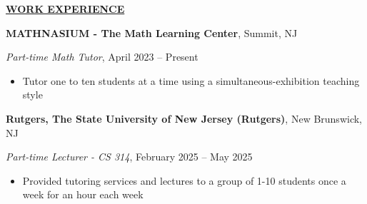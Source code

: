 \documentclass[
]{article}
\providecommand{\tightlist}{%
  \setlength{\itemsep}{0pt}\setlength{\parskip}{0pt}}
\begin{document}

\textbf{\underline{WORK EXPERIENCE}}








\textbf{MATHNASIUM - The Math Learning Center}, Summit, NJ

\emph{Part-time Math Tutor}, April 2023 -- Present

\begin{itemize}
\tightlist
\item
    Tutor one to ten students at a time using a simultaneous-exhibition teaching style
\end{itemize}

\textbf{Rutgers, The State University of New Jersey (Rutgers)}, New Brunswick, NJ

\emph{Part-time Lecturer - CS 314},  February 2025 -- May 2025

\begin{itemize}
\tightlist
\item
    Provided tutoring services and lectures to a group of 1-10 students once a week for an hour each week
\end{itemize}
\end{document}
